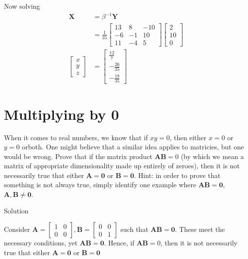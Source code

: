 \documentclass[12pt]{article}
\begin{document}
\begin{enumerate}
        Now solving
        \begin{align*}
            \mathbf{X}&= \beta^{-1} \mathbf{Y}
            \\ &= \frac{1}{35}\begin{bmatrix}
                    13&8&-10 \\ -6&-1&10 \\ 11&-4&5
                \end{bmatrix}\begin{bmatrix}
        2\\10\\0 \end{bmatrix}
                \\ \begin{bmatrix}
            x \\ y\\ z
        \end{bmatrix}&= \begin{bmatrix}
        \frac{12}{7}\\-\frac{26}{35}\\-\frac{18}{35} \end{bmatrix}
        \end{align*}
\end{enumerate}

\section{Multiplying by 0}
When it comes to real numbers, we know that if $xy=0$, then either $x=0$ or $y=0$ orboth. One might believe that a similar idea applies to matricies, but one would be wrong. Prove that if the matrix product $\mathbf{AB} = 0$ (by which we mean a matrix of appropriate dimensionality made up entirely of zeroes), then it is not necessarily true that either $\mathbf{A} = \mathbf{0}$ or $\mathbf{B} = \mathbf{0}$. Hint: in order to prove that something is not always true, simply identify one example where $\mathbf{AB} = \mathbf{0}$, $\mathbf{A},\mathbf{B} \neq \mathbf{0}$.

Solution

Consider $ \mathbf{A} = \begin{bmatrix}
    1&0 \\ 0&0\end{bmatrix},\mathbf{B} = \begin{bmatrix}
        0&0\\0&1    \end{bmatrix}$ such that $\mathbf{AB} = \mathbf{0}$. These meet the necessary conditions, yet $\mathbf{AB} = \mathbf{0}$. Hence, if $\mathbf{AB} = 0$, then it is not necessarily true that either $\mathbf{A} = \mathbf{0}$ or $\mathbf{B} = \mathbf{0}$
\end{document}
